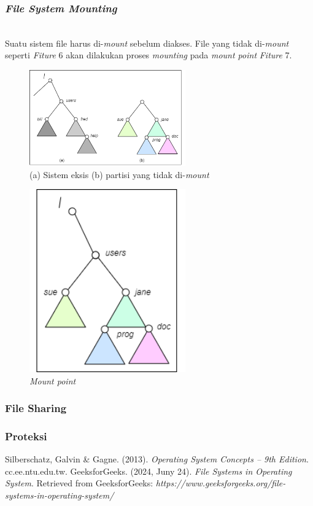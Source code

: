 \documentclass[12pt]{article}
\begin{document}
    \subsubsection{\textit{File System Mounting}}
    \\Suatu sistem file harus di-\textit{mount} sebelum diakses. File yang tidak di-\textit{mount} seperti \textit{Fiture} 6 akan dilakukan proses \textit{mounting} pada \textit{mount point} \textit{Fiture} 7.
        \begin{figure}[h!]
			\centering
			\includegraphics[width=0.6\textwidth]{asset/gambar6.png}
            \caption{(a) Sistem eksis (b) partisi yang tidak di-\textit{mount}}
        \end{figure}
        \begin{figure}[h!]
			\centering
			\includegraphics[width=0.6\textwidth]{asset/gambar7.png}
            \caption{\textit{Mount point}}
        \end{figure}
    \subsubsection{File Sharing}
    \subsubsection{Proteksi}
    \begin{thebibliography}{99}
        Silberschatz, Galvin \& Gagne. (2013). \textit{Operating System Concepts – 9th Edition}. cc.ee.ntu.edu.tw.
        GeeksforGeeks. (2024, Juny 24). \textit{File Systems in Operating System}. Retrieved from GeeksforGeeks: \textit{https://www.geeksforgeeks.org/file-systems-in-operating-system/}
    \end{thebibliography}
\end{document}
